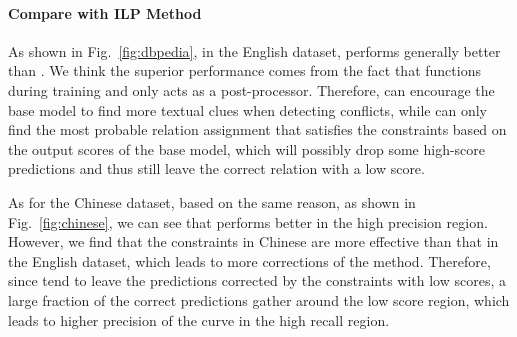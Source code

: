 \paragraph{Compare with ILP Method}
As shown in Fig.~\ref{fig:dbpedia}, in the English dataset, \SL performs generally better than \ILP.
We think the superior performance comes from the fact that \SL functions during training and \ILP only acts as a post-processor.
Therefore, \SL can encourage the base model to find more textual clues when detecting conflicts, while \ILP can only find the most probable relation assignment that satisfies the constraints based on the output scores of the base model, which will possibly drop some high-score predictions and thus still leave the correct relation with a low score.

As for the Chinese dataset, based on the same reason, as shown in Fig.~\ref{fig:chinese}, we can see that \SL performs better in the high precision region.
However, we find that the constraints in Chinese are more effective than that in the English dataset, which leads to more corrections of the \ILP method.
Therefore, since \ILP tend to leave the predictions corrected by the constraints with low scores, a large fraction of the correct predictions gather around the low score region, which leads to higher precision of the \ILP curve in the high recall region.




